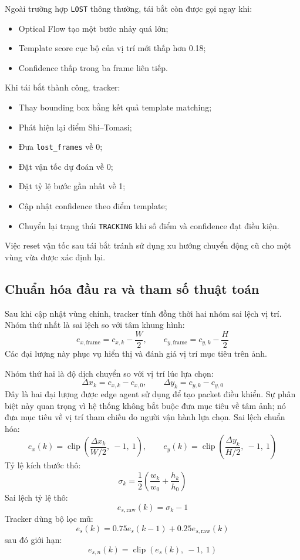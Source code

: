 \documentclass[../DoAn.tex]{subfiles}
\begin{document}
Ngoài trường hợp \texttt{LOST} thông thường, tái bắt còn được gọi ngay khi:
\begin{itemize}
    \item Optical Flow tạo một bước nhảy quá lớn;
    \item Template score cục bộ của vị trí mới thấp hơn 0.18;
    \item Confidence thấp trong ba frame liên tiếp.
\end{itemize}

Khi tái bắt thành công, tracker:
\begin{itemize}
    \item Thay bounding box bằng kết quả template matching;
    \item Phát hiện lại điểm Shi--Tomasi;
    \item Đưa \texttt{lost\_frames} về 0;
    \item Đặt vận tốc dự đoán về 0;
    \item Đặt tỷ lệ bước gần nhất về 1;
    \item Cập nhật confidence theo điểm template;
    \item Chuyển lại trạng thái \texttt{TRACKING} khi số điểm và confidence đạt điều kiện.
\end{itemize}
Việc reset vận tốc sau tái bắt tránh sử dụng xu hướng chuyển động cũ cho một vùng vừa được xác định lại.


\subsection{Chuẩn hóa đầu ra và tham số thuật toán}

Sau khi cập nhật vùng chính, tracker tính đồng thời hai nhóm sai lệch vị trí. Nhóm thứ nhất là sai lệch so với tâm khung hình:
\[
e_{x,\mathrm{frame}} = c_{x,k} - \frac{W}{2}, \qquad e_{y,\mathrm{frame}} = c_{y,k} - \frac{H}{2}
\]
Các đại lượng này phục vụ hiển thị và đánh giá vị trí mục tiêu trên ảnh.

Nhóm thứ hai là độ dịch chuyển so với vị trí lúc lựa chọn:
\[
\Delta x_k = c_{x,k} - c_{x,0}, \qquad \Delta y_k = c_{y,k} - c_{y,0}
\]
Đây là hai đại lượng được edge agent sử dụng để tạo packet điều khiển. Sự phân biệt này quan trọng vì hệ thống không bắt buộc đưa mục tiêu về tâm ảnh; nó đưa mục tiêu về vị trí tham chiếu do người vận hành lựa chọn. Sai lệch chuẩn hóa:
\[
e_x(k) = \operatorname{clip}\left(\frac{\Delta x_k}{W/2},\ -1,\ 1\right), \qquad e_y(k) = \operatorname{clip}\left(\frac{\Delta y_k}{H/2},\ -1,\ 1\right)
\]
Tỷ lệ kích thước thô:
\[
\sigma_k = \frac{1}{2}\left(\frac{w_k}{w_0} + \frac{h_k}{h_0}\right)
\]
Sai lệch tỷ lệ thô:
\[
e_{s,\mathrm{raw}}(k) = \sigma_k - 1
\]
Tracker dùng bộ lọc mũ:
\[
e_s(k) = 0.75 e_s(k-1) + 0.25 e_{s,\mathrm{raw}}(k)
\]
sau đó giới hạn:
\[
e_{s,n}(k) = \operatorname{clip}\left(e_s(k),\ -1,\ 1\right)
\]
\end{document}
